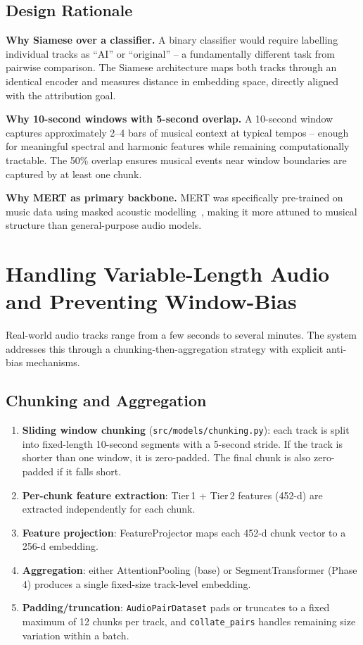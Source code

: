 \documentclass[11pt,a4paper]{article}
\begin{document}
\subsection{Design Rationale}

\textbf{Why Siamese over a classifier.} A binary classifier would require labelling individual tracks as ``AI'' or ``original'' -- a fundamentally different task from pairwise comparison. The Siamese architecture maps both tracks through an identical encoder and measures distance in embedding space, directly aligned with the attribution goal.

\textbf{Why 10-second windows with 5-second overlap.} A 10-second window captures approximately 2--4 bars of musical context at typical tempos -- enough for meaningful spectral and harmonic features while remaining computationally tractable. The 50\% overlap ensures musical events near window boundaries are captured by at least one chunk.

\textbf{Why MERT as primary backbone.} MERT was specifically pre-trained on music data using masked acoustic modelling~\cite{A2}, making it more attuned to musical structure than general-purpose audio models.


\section{Handling Variable-Length Audio and Preventing Window-Bias}
\label{sec:chunking}

Real-world audio tracks range from a few seconds to several minutes. The system addresses this through a chunking-then-aggregation strategy with explicit anti-bias mechanisms.

\subsection{Chunking and Aggregation}

\begin{enumerate}[nosep]
  \item \textbf{Sliding window chunking} (\texttt{src/models/chunking.py}): each track is split into fixed-length 10-second segments with a 5-second stride. If the track is shorter than one window, it is zero-padded. The final chunk is also zero-padded if it falls short.
  \item \textbf{Per-chunk feature extraction}: Tier\,1 + Tier\,2 features (452-d) are extracted independently for each chunk.
  \item \textbf{Feature projection}: FeatureProjector maps each 452-d chunk vector to a 256-d embedding.
  \item \textbf{Aggregation}: either AttentionPooling (base) or SegmentTransformer (Phase\,4) produces a single fixed-size track-level embedding.
  \item \textbf{Padding/truncation}: \texttt{AudioPairDataset} pads or truncates to a fixed maximum of 12 chunks per track, and \texttt{collate\_pairs} handles remaining size variation within a batch.
\end{enumerate}
\end{document}
